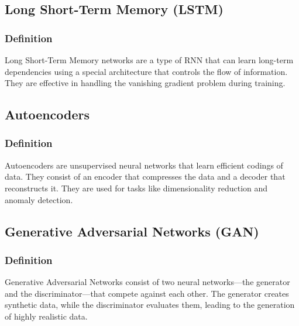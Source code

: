 \subsection{Long Short-Term Memory (LSTM)}
\subsubsection{Definition}
Long Short-Term Memory networks are a type of RNN that can learn long-term dependencies using a special architecture that controls the flow of information. They are effective in handling the vanishing gradient problem during training.

\subsection{Autoencoders}
\subsubsection{Definition}
Autoencoders are unsupervised neural networks that learn efficient codings of data. They consist of an encoder that compresses the data and a decoder that reconstructs it. They are used for tasks like dimensionality reduction and anomaly detection.

\subsection{Generative Adversarial Networks (GAN)}
\subsubsection{Definition}
Generative Adversarial Networks consist of two neural networks—the generator and the discriminator—that compete against each other. The generator creates synthetic data, while the discriminator evaluates them, leading to the generation of highly realistic data.

